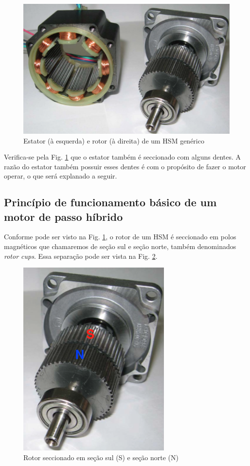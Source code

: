 	\begin{figure}[H]
		\centering
		\includegraphics[scale=.4]{Images/hsmreal2.png}
		\caption{Estator (à esquerda) e rotor (à direita) de um HSM genérico \cite{ieeeRusso}}
		\label{HSMestatorrotor}
	\end{figure} 
	
	Verifica-se pela Fig. \ref{HSMestatorrotor} que o estator também é seccionado com alguns dentes. A razão do estator também possuir esses dentes é com o propósito de fazer o motor operar, o que será explanado a seguir.
	
	\subsection{Princípio de funcionamento básico de um motor de passo híbrido}
	
	Conforme pode ser visto na Fig. \ref{HSMestatorrotor}, o rotor de um HSM é seccionado em polos magnéticos que chamaremos de seção sul e seção norte, também denominados \textit{rotor cups}. Essa separação pode ser vista na Fig. \ref{rotorsec}.
	
	\begin{figure}[H]
		\centering 
		\includegraphics[scale=0.45]{images/hsm_operation/hsmrotorreal}
		\caption{Rotor seccionado em seção sul (S) e seção norte (N) \cite{ieeeRusso}}
		\label{rotorsec}
	\end{figure}
	
